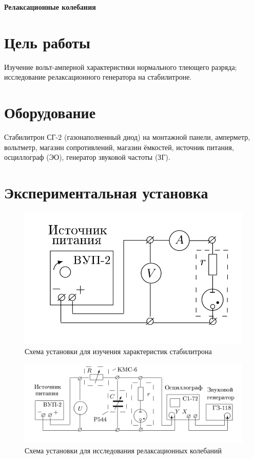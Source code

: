 \documentclass[a4paper, fontsize=14pt]{article}
\begin{document}


\huge
\centering
\textbf{Релаксационные колебания}

\raggedright
\parindent=1cm
\large
\section*{Цель работы}
	Изучение вольт-амперной характеристики нормального тлеющего разряда; исследование релаксационного генератора на стабилитроне.
\section*{Оборудование}
	Стабилитрон СГ-2 (газонаполненный диод) на монтажной панели, амперметр, вольтметр, магазин сопротивлений, магазин ёмкостей, источник питания, осциллограф (ЭО), генератор звуковой частоты (ЗГ).
\section*{Экспериментальная установка}
	\begin{figure}[H]
		\includegraphics[width = 1.0\linewidth]{ust1.png}
		\caption{Схема установки для изучения характеристик стабилитрона}
	\end{figure}
	\begin{figure}[H]
		\includegraphics[width = 1.0\linewidth]{ust2.png}
		\caption{Схема установки для исследования релаксационных колебаний}
	\end{figure}
\end{document}
